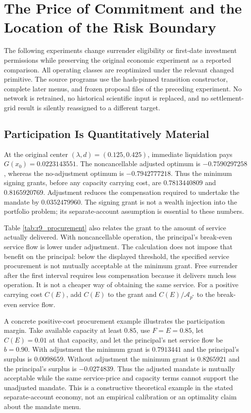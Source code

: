 \section{The Price of Commitment and the Location of the Risk Boundary}
\label{sec:r9_evidence}
The following experiments change surrender eligibility or first-date investment permissions while preserving the original economic experiment as a reported comparison. All operating classes are reoptimized under the relevant changed primitive. The source programs use the hash-pinned transition constructor, complete later menus, and frozen proposal files of the preceding experiment. No network is retrained, no historical scientific input is replaced, and no settlement-grid result is silently reassigned to a different target.

\subsection{Participation Is Quantitatively Material}

At the original center $(\lambda,d)=(0.125,0.425)$, immediate liquidation pays $G(x_0)=0.0223143551$. The noncancellable adjusted optimum is $-0.7590297258$, whereas the no-adjustment optimum is $-0.7942777218$. Thus the minimum signing grants, before any capacity carrying cost, are $0.7813440809$ and $0.8165920769$. Adjustment reduces the compensation required to undertake the mandate by $0.0352479960$. The signing grant is not a wealth injection into the portfolio problem; its separate-account assumption is essential to these numbers.

Table \ref{tab:r9_procurement} also relates the grant to the amount of service actually delivered. With noncancellable operation, the principal's break-even service flow is lower under adjustment. The calculation does not impose that benefit on the principal: below the displayed threshold, the specified service procurement is not mutually acceptable at the minimum grant. Free surrender after the first interval requires less compensation because it delivers much less operation. It is not a cheaper way of obtaining the same service. For a positive carrying cost $C(E)$, add $C(E)$ to the grant and $C(E)/\mathcal A_{p^*}$ to the break-even service flow.

A concrete positive-cost procurement example illustrates the participation margin. Take available capacity at least $0.85$, use $F=E=0.85$, let $C(E)=0.01$ at that capacity, and let the principal's net service flow be $b=0.90$. With adjustment the minimum grant is $0.7913441$ and the principal's surplus is $0.0098659$. Without adjustment the minimum grant is $0.8265921$ and the principal's surplus is $-0.0274839$. Thus the adjusted mandate is mutually acceptable while the same service-price and capacity terms cannot support the unadjusted mandate. This is a constructive theoretical example in the stated separate-account economy, not an empirical calibration or an optimality claim about the mandate menu.

